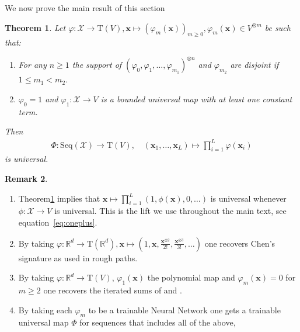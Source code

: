 \documentclass{article} \usepackage{iclr2021_conference,times}
\def\eqref#1{equation~\ref{#1}}
\newcommand{\R}{\mathbb{R}}
\newcommand{\bx}{\mathbf{x}}
\newcommand{\cX}{\mathcal{X}}
\newcommand{\T}[1]{\mathrm{T}({#1})}
\theoremstyle{plain}
\newtheorem{thm}{Theorem}[section]
\theoremstyle{definition}
\newtheorem{remark}[thm]{Remark}
\begin{document}
We now prove the main result of this section
  \begin{thm} \label{prop:univ}
  Let $ \varphi : \cX \to \T{V}, \bx \mapsto (\varphi_m(\bx))_{m \ge 0}, \varphi_m(\bx) \in V^{\otimes m}$ be such that:
  \begin{enumerate}
  	\item For any $ n\geq 1 $ the support of $(\varphi_0,\varphi_{1}, \ldots, \varphi_{m_1})^{\otimes n} $ and $ \varphi_{m_2} $ are disjoint if $ 1\leq m_1 < m_2 $. 
  	\item $ \varphi_0 =1 $ and $\varphi_1:\cX \rightarrow V$ is a bounded universal map with at least one constant term.
  \end{enumerate}
  Then
		\begin{align}\label{eq: phi}
		\Phi:\mathrm{Seq}(\cX) \to \T{V}, \quad (\bx_1,\ldots,\bx_L) \mapsto \prod_{i=1}^L \varphi(\bx_i)
		\end{align}
		is universal.
	\end{thm}
	\begin{remark}\label{rem:seq2tens examples}\,
		\begin{enumerate}[label=(\roman*)]
\item \label{itm:gen}
      Theorem\ref{prop:univ} implies that $\bx \mapsto \prod_{i=1}^L(1,\phi(\bx),0,\ldots)$ is universal whenever $\phi:\cX \rightarrow V$ is universal.
      This is the lift we use throughout the main text, see \eqref{eq:oneplus}.

    \item\label{itm:rp}
        By taking $\varphi : \R^d \to \T{\R^d}, \bx \mapsto (1,\bx,\frac{\bx^{\otimes 2}}{2!}, \frac{\bx^{\otimes{3}}}{3!},\ldots) $ one recovers Chen's signature \citep{Chen54, Chen57, Chen58} as used in rough paths.
      \item\label{itm:drp}
        By taking $\varphi: \R^d \to \T{V}$, $\varphi_1(\bx)$ the polynomial map and $\varphi_m(\bx)=0$ for $m\ge 2$ one recovers the iterated sums of \citet{Tapia19} and \citet{kiraly2016kernels}.   
      \item
        By taking each $ \varphi_m $ to be a trainable Neural Network one gets a trainable universal map $\Phi$ for sequences that includes all of the above,
		\end{enumerate}
	\end{remark}
\end{document}
